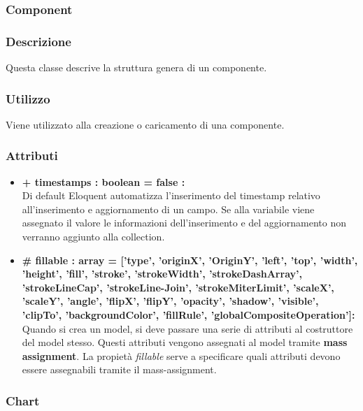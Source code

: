 \subsubsection{Component}


	\subsubsection*{Descrizione}
	Questa classe descrive la struttura genera di un componente.
	
	\subsubsection*{Utilizzo}
	Viene utilizzato alla creazione o caricamento di una componente.
	
	\subsubsection*{Attributi}
	\begin{itemize}
		\item \textbf{+ timestamps : boolean = false :}\\
		Di default Eloquent automatizza l'inserimento del timestamp relativo all'inserimento e aggiornamento di un campo. Se alla variabile viene assegnato il valore le informazioni dell'inserimento e del aggiornamento non verranno aggiunto alla collection.
		\item \textbf{\# fillable : array = [’type’, ’originX’, ’OriginY’, ’left’, ’top’, ’width’, ’height’, ’fill’, ’stroke’, ’strokeWidth’, ’strokeDashArray’, ’strokeLineCap’, ’strokeLine-Join’, ’strokeMiterLimit’, ’scaleX’, ’scaleY’, ’angle’, ’flipX’, ’flipY’, ’opacity’, ’shadow’, ’visible’, ’clipTo’, ’backgroundColor’, ’fillRule’, ’globalCompositeOperation']:}\\
		Quando si crea un model, si deve passare una serie di attributi al costruttore del model stesso. Questi attributi vengono assegnati al model tramite \textbf{mass assignment}. La propietà \textit{fillable} serve a specificare quali attributi devono essere assegnabili tramite il mass-assignment.
	\end{itemize}
	

\newpage
\subsubsection{Chart}


